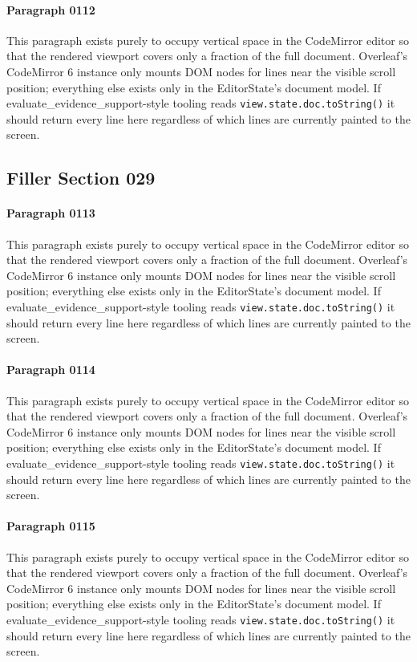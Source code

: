 \documentclass{article}
\begin{document}
\paragraph{Paragraph 0112}
This paragraph exists purely to occupy vertical space in the CodeMirror editor so that the rendered viewport covers only a fraction of the full document. Overleaf's CodeMirror 6 instance only mounts DOM nodes for lines near the visible scroll position; everything else exists only in the EditorState's document model. If evaluate\_evidence\_support-style tooling reads \texttt{view.state.doc.toString()} it should return every line here regardless of which lines are currently painted to the screen.

\subsection{Filler Section 029}
\paragraph{Paragraph 0113}
This paragraph exists purely to occupy vertical space in the CodeMirror editor so that the rendered viewport covers only a fraction of the full document. Overleaf's CodeMirror 6 instance only mounts DOM nodes for lines near the visible scroll position; everything else exists only in the EditorState's document model. If evaluate\_evidence\_support-style tooling reads \texttt{view.state.doc.toString()} it should return every line here regardless of which lines are currently painted to the screen.

\paragraph{Paragraph 0114}
This paragraph exists purely to occupy vertical space in the CodeMirror editor so that the rendered viewport covers only a fraction of the full document. Overleaf's CodeMirror 6 instance only mounts DOM nodes for lines near the visible scroll position; everything else exists only in the EditorState's document model. If evaluate\_evidence\_support-style tooling reads \texttt{view.state.doc.toString()} it should return every line here regardless of which lines are currently painted to the screen.

\paragraph{Paragraph 0115}
This paragraph exists purely to occupy vertical space in the CodeMirror editor so that the rendered viewport covers only a fraction of the full document. Overleaf's CodeMirror 6 instance only mounts DOM nodes for lines near the visible scroll position; everything else exists only in the EditorState's document model. If evaluate\_evidence\_support-style tooling reads \texttt{view.state.doc.toString()} it should return every line here regardless of which lines are currently painted to the screen.
\end{document}

